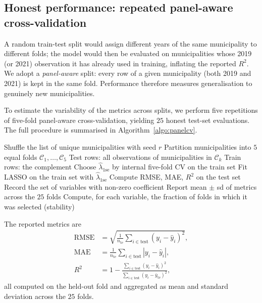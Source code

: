 \documentclass[11pt,a4paper]{article}
\begin{document}
\subsection{Honest performance: repeated panel-aware cross-validation}
\label{sec:perf}

A random train-test split would assign different years of the same
municipality to different folds; the model would then be evaluated on
municipalities whose 2019 (or 2021) observation it has already used in
training, inflating the reported \(R^{2}\). We adopt a
\emph{panel-aware} split: every row of a given municipality (both 2019
and 2021) is kept in the same fold. Performance therefore measures
generalisation to genuinely new municipalities.

To estimate the variability of the metrics across splits, we perform
five repetitions of five-fold panel-aware cross-validation, yielding
\(25\) honest test-set evaluations. The full procedure is summarised
in Algorithm~\ref{algo:panelcv}.

\begin{algorithm}[h!]
  \caption{Repeated panel-aware cross-validation for LASSO}
  \label{algo:panelcv}
  \begin{algorithmic}[1]
      \State Shuffle the list of unique municipalities with seed \(r\)
      \State Partition municipalities into \(5\) equal folds
        \(\mathcal{C}_1, \ldots, \mathcal{C}_5\)
        \State Test rows: all observations of municipalities in
          \(\mathcal{C}_k\)
        \State Train rows: the complement
        \State Choose \(\hat{\lambda}_{\mathrm{1se}}\) by internal
          five-fold CV on the train set
        \State Fit LASSO on the train set with \(\hat{\lambda}_{\mathrm{1se}}\)
        \State Compute RMSE, MAE, \(R^{2}\) on the test set
        \State Record the set of variables with non-zero coefficient
      \EndFor
    \EndFor
    \State Report mean \(\pm\) sd of metrics across the \(25\) folds
    \State Compute, for each variable, the fraction of folds in which
      it was selected (stability)
  \end{algorithmic}
\end{algorithm}

The reported metrics are
\begin{align}
  \mathrm{RMSE} &= \sqrt{\tfrac{1}{n_{\text{te}}}
                 \textstyle\sum_{i \in \text{test}}(y_i - \hat{y}_i)^2}, \\
  \mathrm{MAE}  &= \tfrac{1}{n_{\text{te}}}
                 \textstyle\sum_{i \in \text{test}} |y_i - \hat{y}_i|, \\
  R^{2}         &= 1 - \frac{\sum_{i \in \text{test}}(y_i - \hat{y}_i)^2}
                       {\sum_{i \in \text{test}}(y_i - \bar{y}_{\text{te}})^2},
\end{align}
all computed on the held-out fold and aggregated as mean and standard
deviation across the \(25\) folds.
\end{document}
